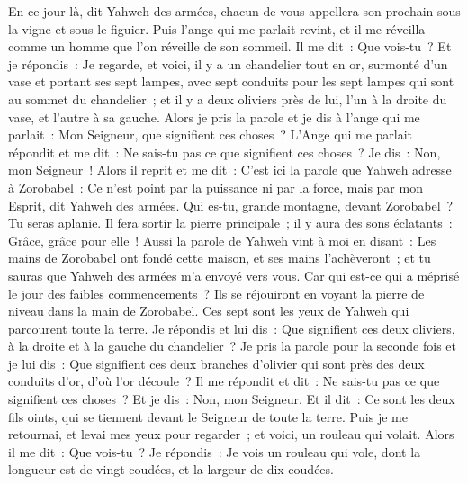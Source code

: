 \begin{multicols}{2}
En ce jour-là, dit Yahweh des armées, chacun de vous appellera son prochain sous la vigne et sous le figuier.
\VerseOne{}Puis l'ange qui me parlait revint, et il me réveilla comme un homme que l'on réveille de son sommeil.
Il me dit~: Que vois-tu~? Et je répondis~: Je regarde, et voici, il y a un chandelier tout en or, surmonté d'un vase et portant ses sept lampes, avec sept conduits pour les sept lampes qui sont au sommet du chandelier~;
et il y a deux oliviers près de lui, l'un à la droite du vase, et l'autre à sa gauche.
Alors je pris la parole et je dis à l'ange qui me parlait~: Mon Seigneur, que signifient ces choses~?
L'Ange qui me parlait répondit et me dit~: Ne sais-tu pas ce que signifient ces choses~? Je dis~: Non, mon Seigneur~!
Alors il reprit et me dit~: C'est ici la parole que Yahweh adresse à Zorobabel~: Ce n'est point par la puissance ni par la force, mais par mon Esprit, dit Yahweh des armées.
Qui es-tu, grande montagne, devant Zorobabel~? Tu seras aplanie. Il fera sortir la pierre principale~; il y aura des sons éclatants~: Grâce, grâce pour elle~!
Aussi la parole de Yahweh vint à moi en disant~:
Les mains de Zorobabel ont fondé cette maison, et ses mains l'achèveront~; et tu sauras que Yahweh des armées m'a envoyé vers vous.
Car qui est-ce qui a méprisé le jour des faibles commencements~? Ils se réjouiront en voyant la pierre de niveau dans la main de Zorobabel. Ces sept sont les yeux de Yahweh qui parcourent toute la terre.
Je répondis et lui dis~: Que signifient ces deux oliviers, à la droite et à la gauche du chandelier~?
Je pris la parole pour la seconde fois et je lui dis~: Que signifient ces deux branches d'olivier qui sont près des deux conduits d'or, d'où l'or découle~?
Il me répondit et dit~: Ne sais-tu pas ce que signifient ces choses~? Et je dis~: Non, mon Seigneur.
Et il dit~: Ce sont les deux fils oints, qui se tiennent devant le Seigneur de toute la terre.
\VerseOne{}Puis je me retournai, et levai mes yeux pour regarder~; et voici, un rouleau qui volait.
Alors il me dit~: Que vois-tu~? Je répondis~: Je vois un rouleau qui vole, dont la longueur est de vingt coudées, et la largeur de dix coudées.

\end{multicols}

